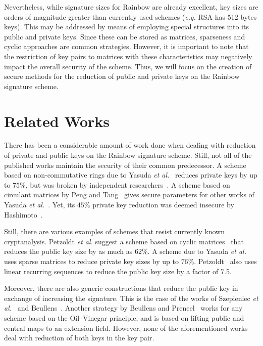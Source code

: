 \documentclass[10pt]{article}
\begin{document}
Nevertheless, while signature sizes for Rainbow are already excellent, key sizes are orders of magnitude greater than currently used schemes (\emph{e.g.} RSA has 512 bytes keys). This may be addressed by means of employing special structures into its public and private keys. Since these can be stored as matrices, sparseness and cyclic approaches are common strategies. However, it is important to note that the restriction of key pairs to matrices with these characteristics may negatively impact the overall security of the scheme. Thus, we will focus on the creation of secure methods for the reduction of public and private keys on the Rainbow signature scheme.

\section{Related Works}

There has been a considerable amount of work done when dealing with reduction of private and public keys on the Rainbow signature scheme. Still, not all of the published works maintain the security of their common predecessor. A scheme based on non-commutative rings due to Yasuda \emph{et al.}~\cite{Yasuda:inproc:2012:feb} reduces private keys by up to $75\%$, but was broken by independent researchers~\cite{Hashimoto:inproc:2013:feb,Thomae:inproc:2012:sep}. A scheme based on circulant matrices by Peng and Tang~\cite{Peng:article:2017:jun} gives secure parameters for other works of Yasuda \emph{et al.}~\cite{Yasuda:inproc:2013:may,Yasuda:inproc:2014:apr}. Yet, its $45\%$ private key reduction was deemed insecure by Hashimoto~\cite{Hashimoto:misc:2018:oct}. 

Still, there are various examples of schemes that resist currently known cryptanalysis. Petzoldt \emph{et al.} suggest a scheme based on cyclic matrices~\cite{Petzoldt:inproc:2010:dec} that reduces the public key size by as much as $62\%$. A scheme due to Yasuda \emph{et al.}~\cite{Yasuda:article:2014:sep} uses sparse matrices to reduce private key sizes by up to $76\%$. Petzoldt~\cite{Petzoldt:phd:2013:jul} also uses linear recurring sequences to reduce the public key size by a factor of 7.5. 

Moreover, there are also generic constructions that reduce the public key in exchange of increasing the signature. This is the case of the works of Szepieniec \emph{et al.}~\cite{Szepieniec:inproc:2017:jun} and Beullens~\cite{Beullens:msc:2017:jun}. Another strategy by Beullens and Preneel~\cite{Beullens:inproc:2017:dec} works for any scheme based on the Oil--Vinegar principle, and is based on lifting public and central maps to an extension field. However, none of the aforementioned works deal with reduction of both keys in the key pair.
\end{document}
